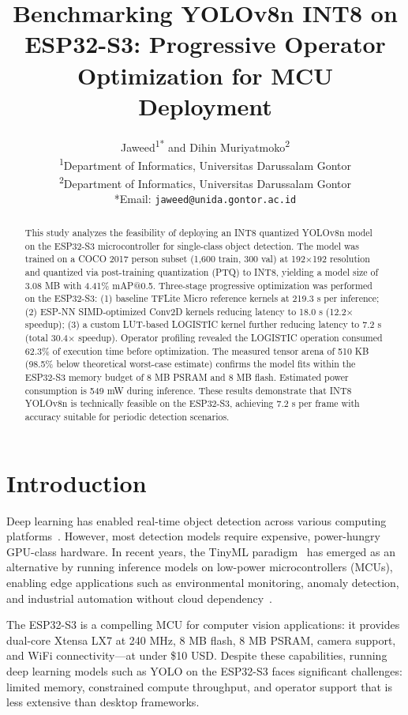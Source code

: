 \documentclass[10pt,twocolumn]{article}
\title{Benchmarking YOLOv8n INT8 on ESP32-S3: Progressive Operator Optimization for MCU Deployment}
\author{Jaweed\textsuperscript{1*} and Dihin Muriyatmoko\textsuperscript{2}\\
\textsuperscript{1}Department of Informatics, Universitas Darussalam Gontor\\
\textsuperscript{2}Department of Informatics, Universitas Darussalam Gontor\\
*Email: \texttt{jaweed@unida.gontor.ac.id}
}
\date{}
\begin{document}
\maketitle

\begin{abstract}
This study analyzes the feasibility of deploying an INT8 quantized YOLOv8n model on the ESP32-S3 microcontroller for single-class object detection. The model was trained on a COCO 2017 person subset (1,600 train, 300 val) at 192$\times$192 resolution and quantized via post-training quantization (PTQ) to INT8, yielding a model size of 3.08 MB with 4.41\% mAP@0.5. Three-stage progressive optimization was performed on the ESP32-S3: (1) baseline TFLite Micro reference kernels at 219.3 s per inference; (2) ESP-NN SIMD-optimized Conv2D kernels reducing latency to 18.0 s (12.2$\times$ speedup); (3) a custom LUT-based LOGISTIC kernel further reducing latency to 7.2 s (total 30.4$\times$ speedup). Operator profiling revealed the LOGISTIC operation consumed 62.3\% of execution time before optimization. The measured tensor arena of 510 KB (98.5\% below theoretical worst-case estimate) confirms the model fits within the ESP32-S3 memory budget of 8 MB PSRAM and 8 MB flash. Estimated power consumption is 549 mW during inference. These results demonstrate that INT8 YOLOv8n is technically feasible on the ESP32-S3, achieving 7.2 s per frame with accuracy suitable for periodic detection scenarios.
\end{abstract}

\section{Introduction}
\label{sec:intro}

Deep learning has enabled real-time object detection across various computing platforms~\cite{yolov1,yolov3,yolov4,ultralytics}. However, most detection models require expensive, power-hungry GPU-class hardware. In recent years, the TinyML paradigm~\cite{tinyml} has emerged as an alternative by running inference models on low-power microcontrollers (MCUs), enabling edge applications such as environmental monitoring, anomaly detection, and industrial automation without cloud dependency~\cite{mcunet,banbury2020bench}.

The ESP32-S3 is a compelling MCU for computer vision applications: it provides dual-core Xtensa LX7 at 240 MHz, 8 MB flash, 8 MB PSRAM, camera support, and WiFi connectivity---at under \$10 USD. Despite these capabilities, running deep learning models such as YOLO on the ESP32-S3 faces significant challenges: limited memory, constrained compute throughput, and operator support that is less extensive than desktop frameworks.
\end{document}
